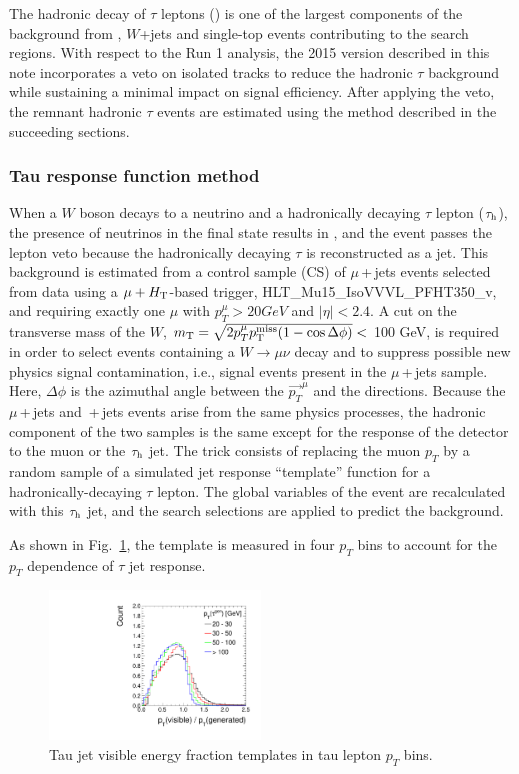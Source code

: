 The hadronic decay of $\tau$ leptons (\tauh) is one of the largest components 
of the background from \ttbar , $W$+jets and single-top events contributing to the 
search regions. With respect to the Run 1 analysis, the 2015 version 
described in this note incorporates a veto on isolated tracks to reduce
the hadronic $\tau$ background while sustaining a minimal 
impact on signal efficiency. After applying the veto, the remnant hadronic
$\tau$ events are estimated using the method described in the succeeding
sections. 

\subsubsection{Tau response function method}
\label{sec:tauresponse}

When a $W$ boson decays to a neutrino and a hadronically decaying 
$\tau$ lepton ($\tau_\mathrm{h}$), the presence of neutrinos in the final state 
results in \MET, and the event passes the lepton veto because the 
hadronically decaying $\tau$ is reconstructed as a jet. 
This background is estimated from a control sample (CS) of $\mu$\,+\,jets 
events selected from data using a $\mu+H_{\mathrm{T}}$-based trigger, 
HLT\_Mu15\_IsoVVVL\_PFHT350\_v, and requiring exactly one 
$\mu$ with $p_{T}^{\mu}>20 GeV$ and $|\eta|<2.4$.
A cut on the transverse mass of the $W$, 
$m_\mathrm{T}=\sqrt{2p_{T}^{\mu}p^{\rm miss}_{\rm T}(1-\cos\Delta\phi)}<$ 100 GeV, 
is required in order 
to select events containing a $W\to\mu\nu$ decay and to suppress 
possible new physics signal contamination, i.e., signal events
present in the $\mu$\,+\,jets sample. Here,
$\Delta\phi$ is the azimuthal angle between the $\vec{p_{T}}^\mu$ and the 
\MET directions.
Because the $\mu$\,+\,jets and \tauh{}\,+\,jets events arise from the same 
physics processes, the hadronic component of the two samples is the same 
except for the response of the detector to the muon or the $\tau_\mathrm{h}$ jet. 
The trick consists of replacing the muon $p_{T}$ by a random sample of a
simulated \tauh jet response ``template'' function for a 
hadronically-decaying $\tau$ lepton. The 
global variables of the event are recalculated with this $\tau_\mathrm{h}$ jet, and the 
search selections are applied to predict the \tauh background.

As shown in Fig.~\ref{fig:templates}, the template is measured in
four $p_{T}$ bins to account for the $p_{T}$ dependence of $\tau$ jet response.

\begin{figure}[htbp]
\centering
\includegraphics[width=0.5\textwidth]{sections/mc4/Backgrounds/HadTau/figures/TauResponseTemplate.pdf}
\caption{Tau jet visible energy fraction templates in tau lepton $p_{T}$ bins.}
\label{fig:templates}
\end{figure}

